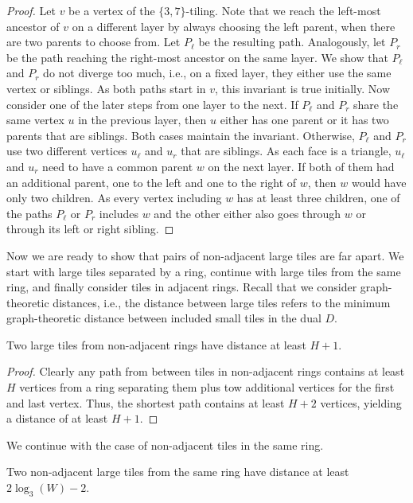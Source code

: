 \begin{proof}
    Let $v$ be a vertex of the $\{3, 7\}$-tiling.
    Note that we reach the left-most ancestor of $v$ on a different layer by always choosing the left parent, when there are two parents to choose from.
    Let $P_\ell$ be the resulting path.
    Analogously, let $P_r$ be the path reaching the right-most ancestor on the same layer.
    We show that $P_\ell$ and $P_r$ do not diverge too much, i.e., on a fixed layer, they either use the same vertex or siblings.
    As both paths start in $v$, this invariant is true initially.
    Now consider one of the later steps from one layer to the next.
    If $P_\ell$ and $P_r$ share the same vertex $u$ in the previous layer, then $u$ either has one parent or it has two parents that are siblings.
    Both cases maintain the invariant.
    Otherwise, $P_\ell$ and $P_r$ use two different vertices $u_\ell$ and $u_r$ that are siblings.
    As each face is a triangle, $u_\ell$ and $u_r$ need to have a common parent $w$ on the next layer.
    If both of them had an additional parent, one to the left and one to the right of $w$, then $w$ would have only two children.
    As every vertex including $w$ has at least three children, one of the paths $P_\ell$ or $P_r$ includes $w$ and the other either also goes through $w$ or through its left or right sibling.
\end{proof}
%
Now we are ready to show that pairs of non-adjacent large tiles are far apart.
We start with large tiles separated by a ring, continue with large tiles from the same ring, and finally consider tiles in adjacent rings.
Recall that we consider graph-theoretic distances, i.e., the distance between large tiles refers to the minimum graph-theoretic distance between included small tiles in the dual $D$.
%
\begin{lemma}
    \label{lem:tiling_large_r_non_adj_rings}
    Two large tiles from non-adjacent rings have distance at least $H + 1$.
\end{lemma}
\begin{proof}
    Clearly any path from between tiles in non-adjacent rings contains at least $H$ vertices from a ring separating them plus tow additional vertices for the first and last vertex.
    Thus, the shortest path contains at least $H + 2$ vertices, yielding a distance of at least $H + 1$.
\end{proof}
%
We continue with the case of non-adjacent tiles in the same ring.
%
\begin{lemma}
    \label{lem:tiling_large_r_same_ring}
    Two non-adjacent large tiles from the same ring have distance at least $2\log_3(W) - 2$.
\end{lemma}

